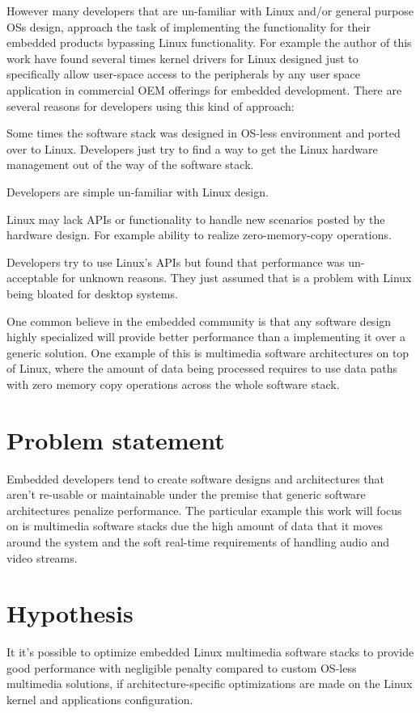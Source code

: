 However many developers that are un-familiar with Linux and/or general purpose \acp{OS} design, approach the task of implementing the functionality for their embedded products bypassing Linux functionality. For example the author of this work have found several times kernel drivers for Linux designed just to specifically allow user-space access to the peripherals by any user space application in commercial \ac{OEM} offerings for embedded development.  There are several reasons for developers using this kind of approach:
\begin{itemize*}
\item Some times the software stack was designed in \ac{OS}-less environment and ported over to Linux. Developers just try to find a way to get the Linux hardware management out of the way of the software stack.
\item Developers are simple un-familiar with Linux design.
\item Linux may lack APIs or functionality to handle new scenarios posted by the hardware design. For example ability to realize zero-memory-copy operations.
\item Developers try to use Linux's APIs but found that performance was un-acceptable for unknown reasons. They just assumed that is a problem with Linux being bloated for desktop systems.
\end{itemize*}

One common believe in the embedded community is that any software design highly specialized will provide better performance than a implementing it over a generic solution. One example of this is multimedia software architectures on top of Linux, where the amount of data being processed requires to use data paths with zero memory copy operations across the whole software stack.
 
\section{Problem statement}
Embedded developers tend to create software designs and architectures that aren't re-usable or maintainable under the premise that generic software architectures penalize performance. The particular example this work will focus on is multimedia software stacks due the high amount of data that it moves around the system and the soft real-time requirements of handling audio and video streams.

\section{Hypothesis}
It it's possible to optimize embedded Linux multimedia software stacks to provide good performance with negligible penalty compared to custom \ac{OS}-less multimedia solutions, if architecture-specific optimizations are made on the Linux kernel and applications configuration.

